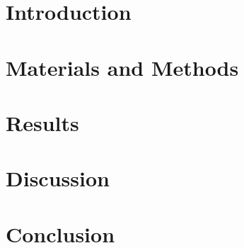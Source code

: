 \documentclass[aps,showpacs,showkeys,preprint,amsmath,amssymb]{revtex4}
\begin{document}

\maketitle

\section{Introduction}
\label{sec:Introduction}


\section{Materials and Methods}
\label{sec:MatMethods}


\section{Results}
\label{sec:Results}


\section{Discussion}
\label{sec:Discussion}

\section{Conclusion}
\label{sec:Conclusion}





\end{document}
